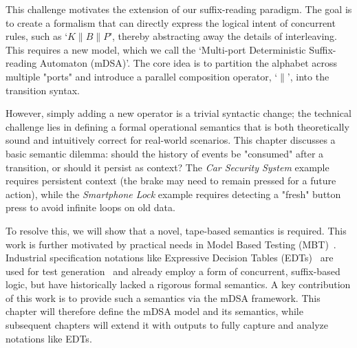   

This challenge motivates the extension of our suffix-reading paradigm. The goal is to create a formalism that can directly express the logical intent of concurrent rules, such as `$K \parallel B \parallel P$', thereby abstracting away the details of interleaving. This requires a new model, which we call the `Multi-port Deterministic Suffix-reading Automaton (mDSA)'. The core idea is to partition the alphabet across multiple "ports" and introduce a parallel composition operator, `$\parallel$', into the transition syntax.

However, simply adding a new operator is a trivial syntactic change; the technical challenge lies in defining a formal operational semantics that is both theoretically sound and intuitively correct for real-world scenarios. This chapter discusses  a basic semantic dilemma: should the history of events be "consumed" after a transition, or should it persist as context? The \emph{Car Security System} example requires persistent context (the brake may need to remain pressed for a future action), while the \emph{Smartphone Lock} example requires detecting a "fresh" button press to avoid infinite loops on old data.

To resolve this, we will show that a novel, tape-based semantics is required. This work is further motivated by practical needs in Model Based Testing (MBT)~\cite{10.1145/1353673.1353681, 10.1002/stvr.456}. Industrial specification notations like Expressive Decision Tables (EDTs)~\cite{DBLP:conf/date/VenkateshSKA14} are used for test generation~\cite{DBLP:conf/enase/VenkateshSZA15a, DBLP:conf/icst/AgrawalVSZV20} and already employ a form of concurrent, suffix-based logic, but have historically lacked a rigorous formal semantics. A key contribution of this work is to provide such a semantics via the mDSA framework. This chapter will therefore define the mDSA model and its semantics, while subsequent chapters will extend it with outputs to fully capture and analyze notations like EDTs.







